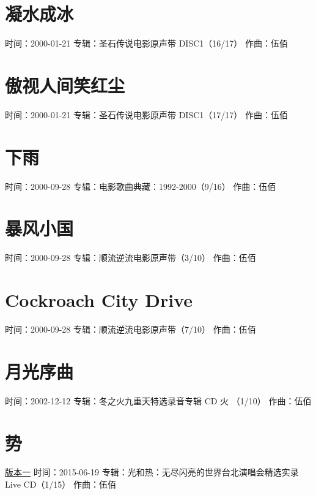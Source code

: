 \documentclass[UTF8,a4paper,oneside,twocolumn,12pt]{ctexbook}
\newcommand{\infopair}[2]{\textbullet #1：#2}
\newcommand{\zq}[1][伍佰]{\infopair{作曲}{#1}}
\newcommand{\zj}[1]{\infopair{专辑}{#1}}
\newcommand{\sj}[1]{\infopair{时间}{#1}}
\newenvironment{info}{\begin{flushleft}\kaishu
	}
	{\end{flushleft}\normalsize\yahei\par}
\begin{document}
\section{凝水成冰}
\begin{info}
	\sj{2000-01-21}
	\zj{圣石传说电影原声带 DISC1（16/17）}
	\zq
\end{info}

\section{傲视人间笑红尘}
\begin{info}
	\sj{2000-01-21}
	\zj{圣石传说电影原声带 DISC1（17/17）}
	\zq
\end{info}

\section{下雨}
\begin{info}
	\sj{2000-09-28}
	\zj{电影歌曲典藏：1992-2000（9/16）}
	\zq
\end{info}

\section{暴风小国}
\begin{info}
	\sj{2000-09-28}
	\zj{顺流逆流电影原声带（3/10）}
	\zq
\end{info}

\section{Cockroach City Drive}
\begin{info}
	\sj{2000-09-28}
	\zj{顺流逆流电影原声带（7/10）}
	\zq
\end{info}

\section{月光序曲}
\begin{info}
	\sj{2002-12-12}
	\zj{冬之火九重天特选录音专辑 CD 火 （1/10）}
	\zq
\end{info}

\section{势}
\begin{info}
	\underline{版本一}
	\sj{2015-06-19}
	\zj{光和热：无尽闪亮的世界台北演唱会精选实录Live CD（1/15）}
	\zq
\end{info}
\end{document}
